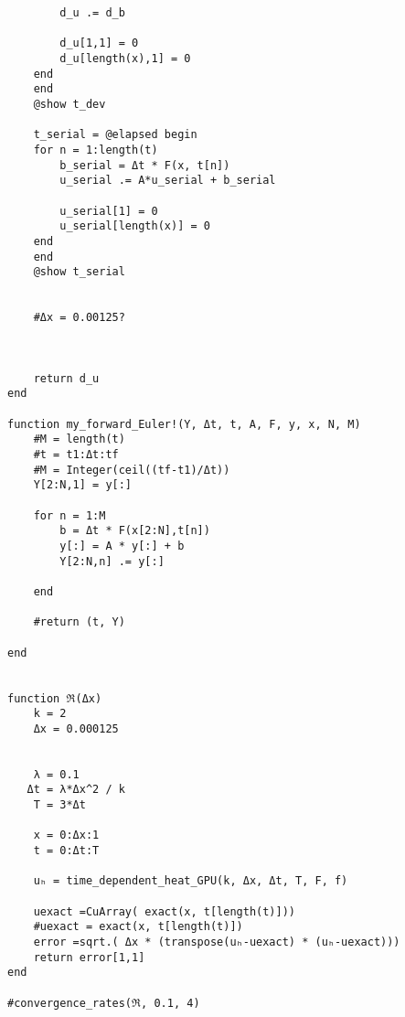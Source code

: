 \documentclass[12pt]{article}
\begin{document}
\begin{verbatim}
        d_u .= d_b

        d_u[1,1] = 0
        d_u[length(x),1] = 0
    end
    end
    @show t_dev

    t_serial = @elapsed begin
    for n = 1:length(t)
        b_serial = Δt * F(x, t[n])
        u_serial .= A*u_serial + b_serial

        u_serial[1] = 0
        u_serial[length(x)] = 0
    end
    end
    @show t_serial


    #Δx = 0.00125?

   

    return d_u
end

function my_forward_Euler!(Y, Δt, t, A, F, y, x, N, M)
    #M = length(t)
    #t = t1:Δt:tf
    #M = Integer(ceil((tf-t1)/Δt))
    Y[2:N,1] = y[:]

    for n = 1:M
        b = Δt * F(x[2:N],t[n])
        y[:] = A * y[:] + b
        Y[2:N,n] .= y[:]

    end

    #return (t, Y)

end


function ℜ(Δx)
    k = 2
    Δx = 0.000125

    
    λ = 0.1
   Δt = λ*Δx^2 / k
    T = 3*Δt

    x = 0:Δx:1
    t = 0:Δt:T

    uₕ = time_dependent_heat_GPU(k, Δx, Δt, T, F, f)

    uexact =CuArray( exact(x, t[length(t)]))
    #uexact = exact(x, t[length(t)])
    error =sqrt.( Δx * (transpose(uₕ-uexact) * (uₕ-uexact)))
    return error[1,1]
end

#convergence_rates(ℜ, 0.1, 4)






\end{verbatim}
\end{document}
